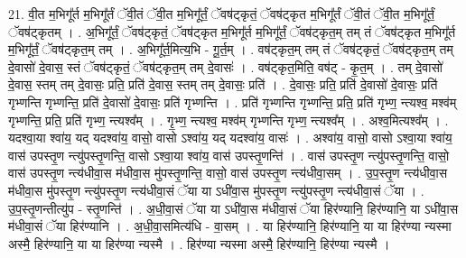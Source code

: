 \documentclass[17pt]{extarticle}
\begin{document}
21. वी॒त म॒भिगू᳚र्त म॒भिगू᳚र्तं ॅवी॒तं ॅवी॒त म॒भिगू᳚र्तं॒ ॅवष॑ट्कृतं॒ ॅवष॑ट्कृत म॒भिगू᳚र्तं ॅवी॒तं ॅवी॒त म॒भिगू᳚र्तं॒ ॅवष॑ट्कृतम् । . अ॒भिगू᳚र्तं॒ ॅवष॑ट्कृतं॒ ॅवष॑ट्कृत म॒भिगू᳚र्त म॒भिगू᳚र्तं॒ ॅवष॑ट्कृत॒म् तम् तं ॅवष॑ट्कृत म॒भिगू᳚र्त म॒भिगू᳚र्तं॒ ॅवष॑ट्कृत॒म् तम् । . अ॒भिगू᳚र्त॒मित्य॒भि - गू॒र्त॒म् । . वष॑ट्कृत॒म् तम् तं ॅवष॑ट्कृतं॒ ॅवष॑ट्कृत॒म् तम् दे॒वासो॑ दे॒वास॒ स्तं ॅवष॑ट्कृतं॒ ॅवष॑ट्कृत॒म् तम् दे॒वासः॑ । . वष॑ट्कृत॒मिति॒ वष॑ट् - कृ॒त॒म् । . तम् दे॒वासो॑ दे॒वास॒ स्तम् तम् दे॒वासः॒ प्रति॒ प्रति॑ दे॒वास॒ स्तम् तम् दे॒वासः॒ प्रति॑ । . दे॒वासः॒ प्रति॒ प्रति॑ दे॒वासो॑ दे॒वासः॒ प्रति॑ गृभ्णन्ति गृभ्णन्ति॒ प्रति॑ दे॒वासो॑ दे॒वासः॒ प्रति॑ गृभ्णन्ति । . प्रति॑ गृभ्णन्ति गृभ्णन्ति॒ प्रति॒ प्रति॑ गृभ्ण॒ न्त्यश्व॒ मश्व॑म् गृभ्णन्ति॒ प्रति॒ प्रति॑ गृभ्ण॒ न्त्यश्व᳚म् । . गृ॒भ्ण॒ न्त्यश्व॒ मश्व॑म् गृभ्णन्ति गृभ्ण॒ न्त्यश्व᳚म् । . अश्व॒मित्यश्व᳚म् । . यदश्वा॒या श्वा॑य॒ यद् यदश्वा॑य॒ वासो॒ वासो ऽश्वा॑य॒ यद् यदश्वा॑य॒ वासः॑ । . अश्वा॑य॒ वासो॒ वासो ऽश्वा॒या श्वा॑य॒ वास॑ उपस्तृ॒ण न्त्यु॑पस्तृ॒णन्ति॒ वासो ऽश्वा॒या श्वा॑य॒ वास॑ उपस्तृ॒णन्ति॑ । . वास॑ उपस्तृ॒ण न्त्यु॑पस्तृ॒णन्ति॒ वासो॒ वास॑ उपस्तृ॒ण न्त्य॑धीवा॒स म॑धीवा॒स मु॑पस्तृ॒णन्ति॒ वासो॒ वास॑ उपस्तृ॒ण न्त्य॑धीवा॒सम् । . उ॒प॒स्तृ॒ण न्त्य॑धीवा॒स म॑धीवा॒स मु॑पस्तृ॒ण न्त्यु॑पस्तृ॒ण न्त्य॑धीवा॒सं ॅया या ऽधी॑वा॒स मु॑पस्तृ॒ण न्त्यु॑पस्तृ॒ण न्त्य॑धीवा॒सं ॅया । . उ॒प॒स्तृ॒णन्तीत्यु॑प - स्तृ॒णन्ति॑ । . अ॒धी॒वा॒सं ॅया या ऽधी॑वा॒स म॑धीवा॒सं ॅया हिर॑ण्यानि॒ हिर॑ण्यानि॒ या ऽधी॑वा॒स म॑धीवा॒सं ॅया हिर॑ण्यानि । . अ॒धी॒वा॒समित्य॑धि - वा॒सम् । . या हिर॑ण्यानि॒ हिर॑ण्यानि॒ या या हिर॑ण्या न्यस्मा अस्मै॒ हिर॑ण्यानि॒ या या हिर॑ण्या न्यस्मै । . हिर॑ण्या न्यस्मा अस्मै॒ हिर॑ण्यानि॒ हिर॑ण्या न्यस्मै । \newline
\end{document}
